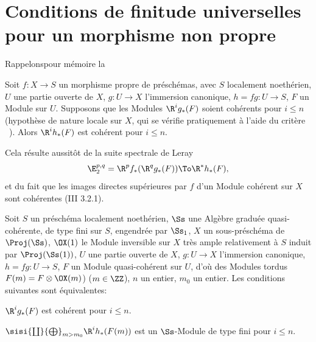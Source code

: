 \section[Conditions de finitude universelles]
{Conditions de finitude universelles pour un morphisme non propre} \label{XII.5} Rappelons\pageoriginale pour m\'emoire la \setcounter{equation}{25}

\begin{proposition} \label{XII.5.1}
Soit $f:X\to S$ un morphisme propre de pr\'esch\'emas, avec $S$ localement noeth\'erien, $U$ une partie ouverte de $X$, $g:U\to X$ l'immersion canonique, $h=fg:U\to S$, $F$ un Module sur $U$. Supposons que les Modules $\R^ig_\ast(F)$ soient coh\'erents pour $i\leq n$ (hypoth\`ese de nature locale sur $X$, qui se v\'erifie pratiquement \`a l'aide du crit\`ere ~). Alors $\R^ih_\ast(F)$ est coh\'erent pour $i\leq n$.
\end{proposition}

Cela r\'esulte aussit\^{o}t de la suite spectrale de Leray
\steco
\begin{equation} \label{eq:XII.26} {} \E_2^{p, q}=\R^pf_\ast(\R^qg_\ast(F)) \To \R^\ast h_\ast(F),
\end{equation}
et du fait que les images directes sup\'erieures par $f$ d'un Module coh\'erent sur $X$ sont coh\'erentes (\EGA III 3.2.1).

\begin{proposition} \label{XII.5.2}
Soit $S$ un pr\'esch\'ema localement noeth\'erien, $\Ss$ une Alg\`ebre gradu\'ee quasi-coh\'erente, de type fini sur $S$, engendr\'ee par $\Ss_1$, $X$ un sous-pr\'esch\'ema de $\Proj(\Ss)$, $\OX(1)$ le Module inversible sur $X$ tr\`es ample relativement \`a $S$ induit par $\Proj(\Ss(1))$, $U$ une partie ouverte de $X$, $g:U\to X$ l'immersion canonique, $h=fg:U\to S$, $F$ un Module quasi-coh\'erent sur $U$, d'o\`u des Modules tordus $F(m)=F\otimes \OX(m)$) ($m\in\ZZ$), $n$ un entier, $m_0$ un entier. Les conditions suivantes sont \'equivalentes:
\begin{enumeratei}
\item
$\R^ig_\ast(F)$ est coh\'erent pour $i\leq n$.
\item
$\sisi{\coprod}{\bigoplus}_{m>m_0}\R^ih_\ast(F(m))$ est un $\Ss$-Module de type fini pour $i\leq n$.
\end{enumeratei}
\end{proposition}

